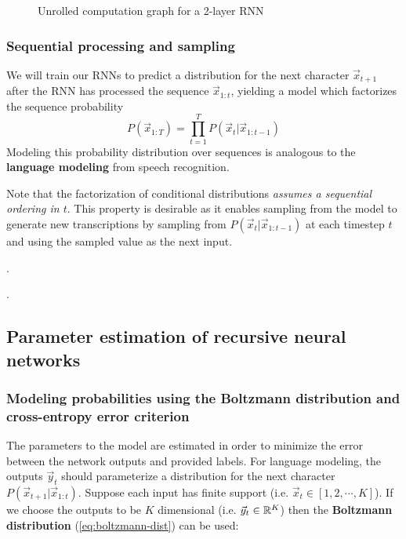 \begin{figure}[htpb]
    \centering
    
    \caption{Unrolled computation graph for a 2-layer RNN}
    \label{fig:rnn-multi-unrolled}
\end{figure}

\subsubsection{Sequential processing and sampling}

We will train our RNNs to predict a distribution for the next character
$\vec{x}_{t+1}$ after the RNN has processed the sequence $\vec{x}_{1:t}$,
yielding a model which factorizes the sequence probability
\begin{equation}
    P(\vec{x}_{1:T}) = \prod_{t=1}^T P(\vec{x}_t | \vec{x}_{1:t-1} )
\end{equation}
Modeling this probability distribution over sequences is analogous to the
\textbf{language modeling} from speech recognition.

Note that the factorization of conditional distributions \emph{assumes a
sequential ordering in $t$}. This property is desirable as it enables sampling
from the model to generate new transcriptions by sampling from $P(\vec{x}_t |
\vec{x}_{1:t-1})$ at each timestep $t$ and using the sampled value as the next
input.

.

.

\subsection{Parameter estimation of recursive neural networks}

\subsubsection{Modeling probabilities using the Boltzmann distribution and cross-entropy error criterion}

The parameters to the model are estimated in order to minimize the error
between the network outputs and provided labels. For language modeling, the
outputs $\vec{y}_t$ should parameterize a distribution for the next character
$P(\vec{x}_{t+1} | \vec{x}_{1:t})$. Suppose each input has finite support (i.e.
$\vec{x}_t \in [1,2,\cdots,K]$). If we choose the outputs to be $K$ dimensional
(i.e. $\vec{y}_t \in \mathbb{R}^K$) then the \textbf{Boltzmann distribution}
(\autoref{eq:boltzmann-dist}) can be used:

